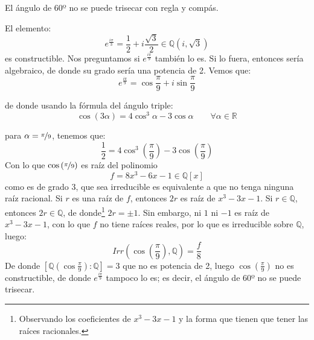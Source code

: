 \begin{ejemplo}
    El ángulo de 60º no se puede trisecar con regla y compás.
    \begin{figure}[H]
        \centering
    \end{figure}
    \noindent
    El elemento:
    \begin{equation*}
        e^{\frac{i\pi}{3}} = \dfrac{1}{2} + i\dfrac{\sqrt{3}}{2} \in \mathbb{Q}\left(i,\sqrt{3}\right)
    \end{equation*}
    es constructible. Nos preguntamos si $e^{\frac{i\pi}{9}}$ también lo es. Si lo fuera, entonces sería algebraico, de donde su grado sería una potencia de 2. Vemos que:
    \begin{equation*}
        e^{\frac{i\pi}{9}} = \cos \dfrac{\pi}{9} + i\sin \dfrac{\pi}{9}
    \end{equation*}

    de donde usando la fórmula del ángulo triple:
    \begin{equation*}
        \cos(3\alpha) = 4\cos^3\alpha - 3\cos \alpha \qquad \forall \alpha\in \mathbb{R}
    \end{equation*}

    para $\alpha = \nicefrac{\pi}{9}$, tenemos que:
    \begin{equation*}
        \dfrac{1}{2} = 4\cos^3\left(\frac{\pi}{9}\right) - 3\cos\left(\frac{\pi}{9}\right)
    \end{equation*}
    Con lo que $\cos\left(\nicefrac{\pi}{9}\right)$ es raíz del polinomio
    \begin{equation*}
        f = 8x^3-6x-1 \in \mathbb{Q}[x]
    \end{equation*}
    como es de grado 3, que sea irreducible es equivalente a que no tenga ninguna raíz racional. Si $r$ es una raíz de $f$, entonces $2r$ es raíz de $x^3-3x-1$. Si $r\in \mathbb{Q}$, entonces $2r\in \mathbb{Q}$, de donde\footnote{Observando los coeficientes de $x^3-3x-1$ y la forma que tienen que tener las raíces racionales.} $2r=\pm 1$. Sin embargo, ni $1$ ni $-1$ es raíz de $x^3-3x-1$, con lo que $f$ no tiene raíces reales, por lo que es irreducible sobre $\mathbb{Q}$, luego:
    \begin{equation*}
        Irr\left(\cos\left(\frac{\pi}{9}\right), \mathbb{Q}\right) = \frac{f}{8}
    \end{equation*}
    De donde $[\mathbb{Q}\left(\cos\frac{\pi}{9}\right) : \mathbb{Q}] = 3$ que no es potencia de 2, luego $\cos\left(\frac{\pi}{9}\right)$ no es constructible, de donde $e^{\frac{i\pi}{9}}$ tampoco lo es; es decir, el ángulo de $60$º no se puede trisecar.
\end{ejemplo}


